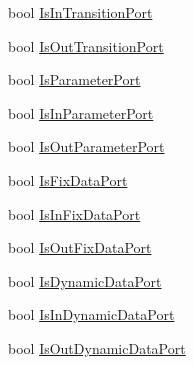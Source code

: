 \begin{DoxyCompactItemize}
bool \hyperlink{classi_c_s___engine_object_a9e55522ec4160595fd6879fd09c9df0b}{Is\+In\+Transition\+Port}
\item 
bool \hyperlink{classi_c_s___engine_object_a6d380de88c6bfb1df3f3721b2ad3daeb}{Is\+Out\+Transition\+Port}
\item 
bool \hyperlink{classi_c_s___engine_object_a4cf258cd2b60cf5f6d72cded067e68e9}{Is\+Parameter\+Port}
\item 
bool \hyperlink{classi_c_s___engine_object_afb4b7b4a2c36e8b4621faeb4a4140310}{Is\+In\+Parameter\+Port}
\item 
bool \hyperlink{classi_c_s___engine_object_ad78ade2d6f30073cc6a516993c3b93cd}{Is\+Out\+Parameter\+Port}
\item 
bool \hyperlink{classi_c_s___engine_object_a413e5dfa90ca85367b2a4e63d18b3598}{Is\+Fix\+Data\+Port}
\item 
bool \hyperlink{classi_c_s___engine_object_a533a545a6478914b5bafdea48e1052e8}{Is\+In\+Fix\+Data\+Port}
\item 
bool \hyperlink{classi_c_s___engine_object_a3dd6f89f26ece04f14a47b2764f4337f}{Is\+Out\+Fix\+Data\+Port}
\item 
bool \hyperlink{classi_c_s___engine_object_a0d484dd85a793563663fd9e1ade85925}{Is\+Dynamic\+Data\+Port}
\item 
bool \hyperlink{classi_c_s___engine_object_a8adca16e4c2c4239c593ed2e6c30fc6c}{Is\+In\+Dynamic\+Data\+Port}
\item 
bool \hyperlink{classi_c_s___engine_object_ac7e4a58e77f73c6789701d2928f85faa}{Is\+Out\+Dynamic\+Data\+Port}
\item 

\end{DoxyCompactItemize}
